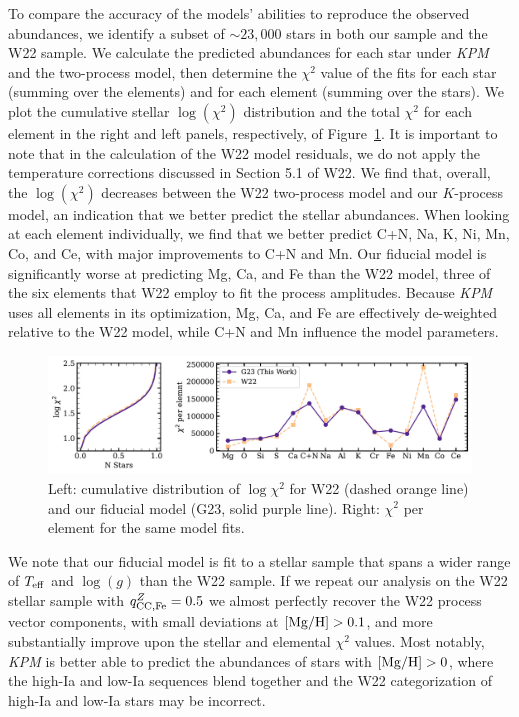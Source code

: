 \documentclass[modern]{aastex631}
\newcommand{\mgh}{[{\rm Mg}/{\rm H}]}
\newcommand{\logg}{\log(g)}
\newcommand{\teff}{T_{\rm eff}}
\newcommand{\qccFe}{q_{{\rm CC, Fe}}^{Z}}
\newcommand{\name}{\textsl{KPM}}
\begin{document}
To compare the accuracy of the models' abilities to reproduce the observed abundances, we identify a subset of $\sim 23,000$ stars in both our sample and the W22 sample. We calculate the predicted abundances for each star under \name{} and the two-process model, then determine the $\chi^2$ value of the fits for each star (summing over the elements) and for each element (summing over the stars). We plot the cumulative stellar $\log(\chi^2)$ distribution and the total $\chi^2$ for each element in the right and left panels, respectively, of Figure~\ref{fig:comp_w22}. It is important to note that in the calculation of the W22 model residuals, we do not apply the temperature corrections discussed in Section 5.1 of W22. We find that, overall, the $\log(\chi^2)$ decreases between the W22 two-process model and our $K$-process model, an indication that we better predict the stellar abundances. When looking at each element individually, we find that we better predict C+N, Na, K, Ni, Mn, Co, and Ce, with major improvements to C+N and Mn. Our fiducial model is significantly worse at predicting Mg, Ca, and Fe than the W22 model, three of the six elements that W22 employ to fit the process amplitudes. Because \name{} uses all elements in its optimization, Mg, Ca, and Fe are effectively de-weighted relative to the W22 model, while C+N and Mn influence the model parameters.

\begin{figure}[htb!]
    \centering
    \includegraphics[width=\textwidth]{Paper/Figures/comp_w22.pdf}
    \caption{Left: cumulative distribution of $\log \chi^2$ for W22 (dashed orange line) and our fiducial model (G23, solid purple line). Right: $\chi^2$ per element for the same model fits. }
    \label{fig:comp_w22}
\end{figure}

We note that our fiducial model is fit to a stellar sample that spans a wider range of $\teff$ and $\logg$ than the W22 sample. If we repeat our analysis on the W22 stellar sample with $\qccFe=0.5$ we almost perfectly recover the W22 process vector components, with small deviations at $\mgh>0.1$, and more substantially improve upon the stellar and elemental $\chi^2$ values. Most notably, \name{} is better able to predict the abundances of stars with $\mgh>0$, where the high-Ia and low-Ia sequences blend together and the W22 categorization of high-Ia and low-Ia stars may be incorrect.
\end{document}
